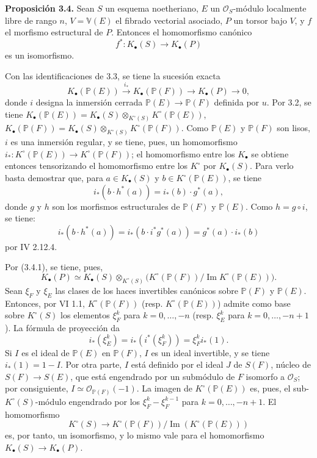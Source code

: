 \textbf{Proposición 3.4.} Sean $S$ un esquema noetheriano, $E$ un $\mathcal O_S$-módulo localmente libre de rango $n$, $V=\mathbb V(E)$ el fibrado vectorial asociado, $P$ un torsor bajo $V$, y $f$ el morfismo estructural de $P$. Entonces el homomorfismo canónico
\[
f^*:K_\bullet(S)\longrightarrow K_\bullet(P)
\]
es un isomorfismo.

Con las identificaciones de 3.3, se tiene la sucesión exacta
\[
K_\bullet(\mathbb P(E))\xrightarrow{i_*}K_\bullet(\mathbb P(F))\longrightarrow K_\bullet(P)\longrightarrow 0,
\tag{3.4.1}
\]
donde $i$ designa la inmersión cerrada $\mathbb P(E)\to \mathbb P(F)$ definida por $u$. Por 3.2, se tiene $K_\bullet(\mathbb P(E))=K_\bullet(S)\otimes_{K^\circ(S)}K^\circ(\mathbb P(E))$, $K_\bullet(\mathbb P(F))=K_\bullet(S)\otimes_{K^\circ(S)}K^\circ(\mathbb P(F))$.
Como $\mathbb P(E)$ y $\mathbb P(F)$ son lisos, $i$ es una inmersión regular, y se tiene, pues, un homomorfismo $i_*:K^\circ(\mathbb P(E))\to K^\circ(\mathbb P(F))$; el homomorfismo entre los $K_\bullet$ se obtiene entonces tensorizando el homomorfismo entre los $K^\circ$ por $K_\bullet(S)$. Para verlo basta demostrar que, para $a\in K_\bullet(S)$ y $b\in K^\circ(\mathbb P(E))$, se tiene
\[
i_*(b\cdot h^*(a))=i_*(b)\cdot g^*(a),
\]
donde $g$ y $h$ son los morfismos estructurales de $\mathbb P(F)$ y $\mathbb P(E)$. Como $h=g\circ i$, se tiene:
\[
i_*(b\cdot h^*(a))=i_*(b\cdot i^*g^*(a))=g^*(a)\cdot i_*(b)
\]
por IV 2.12.4.

Por (3.4.1), se tiene, pues,
\[
K_\bullet(P)\simeq K_\bullet(S)\otimes_{K^\circ(S)}
\bigl(K^\circ(\mathbb P(F))/\operatorname{Im}K^\circ(\mathbb P(E))\bigr).
\]
Sean $\xi_F$ y $\xi_E$ las clases de los haces invertibles canónicos sobre $\mathbb P(F)$ y $\mathbb P(E)$. Entonces, por VI 1.1, $K^\circ(\mathbb P(F))$ (resp. $K^\circ(\mathbb P(E))$) admite como base sobre $K^\circ(S)$ los elementos $\xi_F^k$ para $k=0,\ldots,-n$ (resp. $\xi_E^k$ para $k=0,\ldots,-n+1$). La fórmula de proyección da
\[
i_*(\xi_E^k)=i_*(i^*(\xi_F^k))=\xi_F^k i_*(1).
\]
Si $I$ es el ideal de $\mathbb P(E)$ en $\mathbb P(F)$, $I$ es un ideal invertible, y se tiene $i_*(1)=1-I$. Por otra parte, $I$ está definido por el ideal $J$ de $S(F)$, núcleo de $S(F)\to S(E)$, que está engendrado por un submódulo de $F$ isomorfo a $\mathcal O_S$; por consiguiente, $I\simeq \mathcal O_{\mathbb P(F)}(-1)$. La imagen de $K^\circ(\mathbb P(E))$ es, pues, el sub-$K^\circ(S)$-módulo engendrado por los $\xi_F^k-\xi_F^{k-1}$ para $k=0,\ldots,-n+1$. El homomorfismo
\[
K^\circ(S)\longrightarrow K^\circ(\mathbb P(F))/\operatorname{Im}(K^\circ(\mathbb P(E)))
\]
es, por tanto, un isomorfismo, y lo mismo vale para el homomorfismo $K_\bullet(S)\to K_\bullet(P)$.

